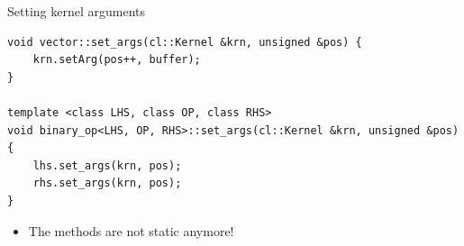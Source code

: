 \documentclass[@BEAMER_OPTIONS@]{beamer}
\begin{document}
\begin{frame}[fragile]{Setting kernel arguments}
    \begin{exampleblock}{}
        \begin{lstlisting}
void vector::set_args(cl::Kernel &krn, unsigned &pos) {
    krn.setArg(pos++, buffer);
}

template <class LHS, class OP, class RHS>
void binary_op<LHS, OP, RHS>::set_args(cl::Kernel &krn, unsigned &pos) {
    lhs.set_args(krn, pos);
    rhs.set_args(krn, pos);
}
        \end{lstlisting}
    \end{exampleblock}

    \vspace{\baselineskip}

    \begin{itemize}
        \item The methods are not static anymore!
    \end{itemize}
\end{frame}

\end{document}
